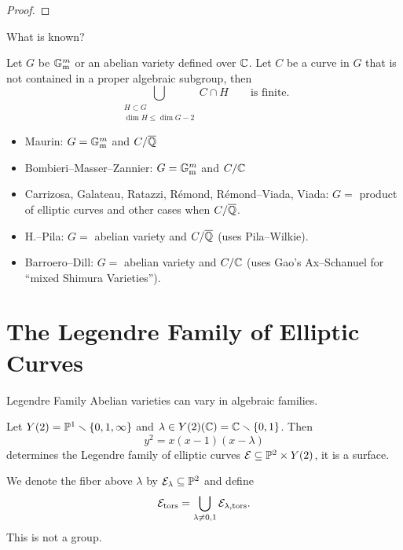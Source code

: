 \documentclass{beamer}
\begin{document}
\begin{frame}
  \begin{proof}
    \vspace{6cm}
  \end{proof}  
\end{frame}

\begin{frame}{What is known?}
  \begin{theorem}
    Let $G$ be ${\mathbb{G}}_\mathrm{m}^m$ or an abelian variety defined over
    ${\mathbb{C}}$. Let $C$ be a curve in $G$ that is not contained in a proper
    algebraic subgroup, then
    \begin{equation*}
      \bigcup_{\substack{H\subset G \\\dim H\le \dim G-2}} C\cap H
      \qquad\text{is finite.}
    \end{equation*}
  \end{theorem}
  \begin{itemize}
  \item Maurin: $G={\mathbb{G}}_{\mathrm{m}}^m$ and $C/{\overline{\mathbb{Q}}}$
  \item Bombieri--Masser--Zannier: $G={\mathbb{G}}_{\mathrm{m}}^m$ and $C/{\mathbb{C}}$
  \item Carrizosa, Galateau, Ratazzi, R\'emond,
    R\'emond--Viada,  Viada: $G=$ product of elliptic
    curves and other cases when $C/{\overline{\mathbb{Q}}}$. 
  \item H.--Pila: $G=$ abelian variety and $C/{\overline{\mathbb{Q}}}$ (uses
    Pila--Wilkie). 
  \item Barroero--Dill: $G=$ abelian variety and $C/{\mathbb{C}}$ (uses Gao's
    Ax--Schanuel for ``mixed Shimura Varieties''). 
  \end{itemize}
  
\end{frame}

\section{The Legendre Family of Elliptic Curves}

\begin{frame}{Legendre Family}
  Abelian varieties can vary in algebraic families.
  \begin{example}
    Let $Y(2) = {\mathbb{P}}^1\smallsetminus\{0,1,\infty\}$ and $\lambda\in
    Y(2)({\mathbb{C}})={\mathbb{C}}\smallsetminus\{0,1\}$. Then
    \begin{equation*}
      y^2 = x(x-1)(x-\lambda)
    \end{equation*}
    determines 
    the \alert{Legendre family of elliptic
      curves} ${\mathcal E}\subseteq {\mathbb{P}}^2\times Y(2)$, it is a surface.
    
    We denote the fiber above $\lambda$  by ${\mathcal E}_\lambda
    \subseteq{\mathbb{P}}^2$ and    
    define
    \begin{equation*}
      {\mathcal E}_{\mathrm{tors}} = \bigcup_{\lambda\not=0,1}
      {\mathcal E}_{\lambda,\mathrm{tors}}. 
    \end{equation*}
    This is \alert{not} a group.
  \end{example}
\end{frame}
\end{document}
